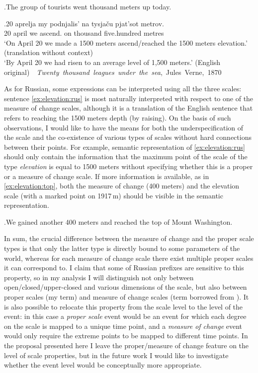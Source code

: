 \ex.\label{ex:elevation}The group of tourists went thousand meters up today.

\exg.\label{ex:elevation:rus}20 aprelja my podnjalis' na tysja\v{c}u pjat'sot metrov.\\
20 april we ascend. on thousand five.hundred metres\\
\trans `On April 20 we made a 1500 meters ascend/reached the 1500 meters elevation.' (translation without context)\\
`By April 20 we had risen to an average level of 1,500 meters.' (English original)~~\hbox{}\hfill\hbox{\textit{Twenty thousand leagues under the sea}, Jules Verne, 1870}

As for Russian, some expressions can be interpreted using all the three scales: sentence \ref{ex:elevation:rus} is most naturally interpreted with respect to one of the measure of change scales, although it is a translation of the English sentence that refers to reaching the 1500 meters depth (by raising). On the basis of such observations, I would like to have the means for both the underspecification of the scale and the co-existence of various types of scales without hard connections between their points. For example, semantic representation of \ref{ex:elevation:rus} should only contain the information that the maximum point of the scale of the type \textit{elevation} is equal to 1500 meters without specifying whether this is a proper or a measure of change scale. If more information is available, as in \ref{ex:elevation:top}, both the measure of change (400 meters) and the elevation scale (with a marked point on 1917\,m) should be visible in the semantic representation.

\ex.\label{ex:elevation:top}We gained another 400 meters and reached the top of Mount Washington.

In sum, the crucial difference between the measure of change and the proper scale types is that only the latter type is directly bound to some parameters of the world, whereas for each measure of change scale there exist multiple proper scales it can correspond to. I claim that some of Russian prefixes are sensitive to this property, so in my analysis I will distinguish not only between open\slash closed\slash upper-closed and various dimensions of the scale, but also between proper scales (my term) and measure of change scales (term borrowed from \citealt{KennedyLevin:08}). It is also possible to relocate this property from the scale level to the level of the event: in this case a \textit{proper scale} event would be an event for which each degree on the scale is mapped to a unique time point, and a \textit{measure of change} event would only require the extreme points to be mapped to different time points. In the proposal presented here I leave the proper/measure of change feature on the level of scale properties, but in the future work I would like to investigate whether the event level would be conceptually more appropriate.

